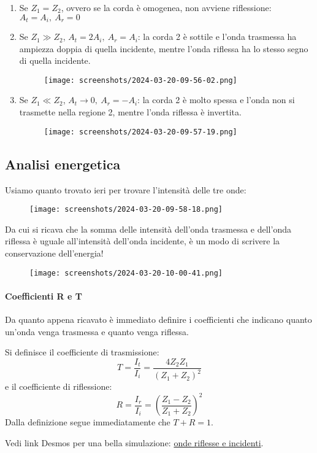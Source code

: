 \begin{enumerate}
	\item Se \(Z_1 = Z_2\), ovvero se la corda è omogenea, non avviene riflessione: \(A_t = A_i,\ A_r = 0\) 
	\item Se \(Z_1 \gg Z_2\), \(A_t = 2A_i,\ A_r=A_i\): la corda 2 è sottile e l'onda trasmessa ha ampiezza doppia di quella incidente, mentre l'onda riflessa ha lo stesso segno di quella incidente.  
	\begin{figure}[H]
		\centering
		\texttt{[image: screenshots/2024-03-20-09-56-02.png]}
	\end{figure}
	\item Se \(Z_1 \ll Z_2\), \(A_t \to 0,\ A_r = -A_i\): la corda 2 è molto spessa e l'onda non si trasmette nella regione 2, mentre l'onda riflessa è invertita.
	\begin{figure}[H]
		\centering
		\texttt{[image: screenshots/2024-03-20-09-57-19.png]}
	\end{figure}  
\end{enumerate}
\subsection{Analisi energetica}
Usiamo quanto trovato ieri per trovare l'intensità delle tre onde:
\begin{figure}[H]
	\centering
	\texttt{[image: screenshots/2024-03-20-09-58-18.png]}
\end{figure}
Da cui si ricava che la somma delle intensità dell'onda trasmessa e dell'onda riflessa è uguale all'intensità dell'onda incidente, è un modo di scrivere la conservazione dell'energia!
\begin{figure}[H]
	\centering
	\texttt{[image: screenshots/2024-03-20-10-00-41.png]}
\end{figure}
\paragraph{Coefficienti R e T}
Da quanto appena ricavato è immediato definire i coefficienti che indicano quanto un'onda venga trasmessa e quanto venga riflessa.
\begin{definition}
	Si definisce il coefficiente di trasmissione:
	\[
		T= \frac{I_t}{I_i} = \frac{4Z_2 Z_1}{(Z_1 +Z_2)^{2} }
	\]
	e il coefficiente di riflessione:
	\[
		R= \frac{I_r}{I_i}=\left( \frac{Z_1 - Z_2}{Z_1 + Z_2} \right) ^{2} 
	\]
	Dalla definizione segue immediatamente che \(T+R=1\).
\end{definition}
Vedi link Desmos per una bella simulazione: \href{https://www.desmos.com/calculator/42zmaoac6h?lang=it}{onde riflesse e incidenti}.

